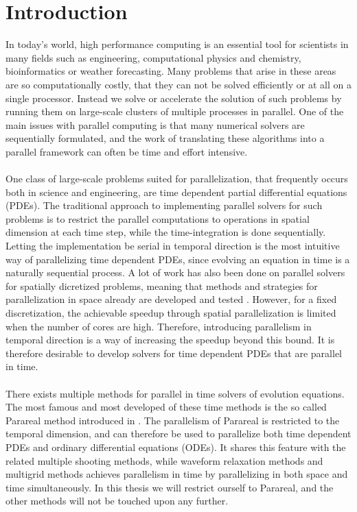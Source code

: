 \chapter{Introduction}
In today’s world, high performance computing is an essential tool for scientists in many fields such as engineering, computational physics and chemistry, bioinformatics or weather forecasting. Many problems that arise in these areas are so computationally costly, that they can not be solved efficiently or at all on a single processor. Instead we solve or accelerate the solution of such problems by running them on large-scale clusters of multiple processes in parallel. One of the main issues with parallel computing is that many numerical solvers are sequentially formulated, and the work of translating these algorithms into a parallel framework can often be time and effort intensive.
\\
\\
One class of large-scale problems suited for parallelization, that frequently occurs both in science and engineering, are time dependent partial differential equations (PDEs). The traditional approach to implementing parallel solvers for such problems is to restrict the parallel computations to operations in spatial dimension at each time step, while the time-integration is done sequentially. Letting the implementation be serial in temporal direction is the most intuitive way of parallelizing time dependent PDEs, since evolving an equation in time is a naturally sequential process. A lot of work has also been done on parallel solvers for spatially dicretized problems, meaning that methods and strategies for parallelization in space already are developed and tested \cite{elman2014finite}. However, for a fixed discretization, the achievable speedup through spatial parallelization is limited when the number of cores are high. Therefore, introducing parallelism in temporal direction is a way of increasing the speedup beyond this bound. It is therefore desirable to develop solvers for time dependent PDEs that are parallel in time.
\\
\\
There exists multiple methods for parallel in time solvers of evolution equations. The most famous and most developed of these time methods is the so called Parareal method introduced in \cite{lions2001resolution}. The parallelism of Parareal is restricted to the temporal dimension, and can therefore be used to parallelize both time dependent PDEs and ordinary differential equations (ODEs). It shares this feature with the related multiple shooting methods\cite{nievergelt1964parallel,bellen1989parallel}, while waveform relaxation methods\cite{lelarasmee1982waveform,gander1996overlapping} and multigrid methods\cite{hackbusch1985parabolic,lubich1987multi,horton1995space} achieves parallelism in time by parallelizing in both space and time simultaneously. In this thesis we will restrict ourself to Parareal, and the other methods will not be touched upon any further.
